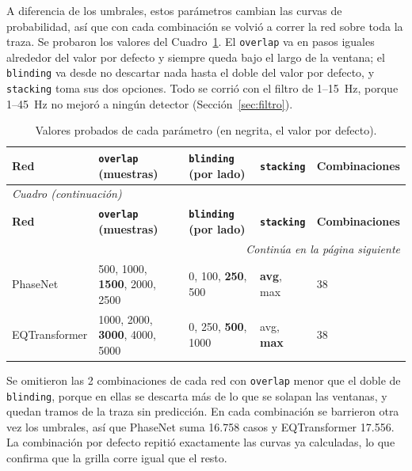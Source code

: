 \documentclass[11pt,a4paper,oneside,spanish,oldfontcommands]{memoir}
\newcommand{\cabecera}[2]{%
  \toprule #1 \\ \midrule \endfirsthead
  \multicolumn{#2}{l}{\itshape Cuadro \thetable{} (continuación)}\\
  \toprule #1 \\ \midrule \endhead
  \midrule \multicolumn{#2}{r}{\itshape Continúa en la página siguiente}\\ \endfoot
  \bottomrule \endlastfoot}
\begin{document}
A diferencia de los umbrales, estos parámetros cambian las curvas de
probabilidad, así que con cada combinación se volvió a correr la red sobre toda
la traza. Se probaron los valores del Cuadro~\ref{tab:grilla-valores}. El
\texttt{overlap} va en pasos iguales alrededor del valor por defecto y siempre
queda bajo el largo de la ventana; el \texttt{blinding} va desde no descartar
nada hasta el doble del valor por defecto, y \texttt{stacking} toma sus dos
opciones. Todo se corrió con el filtro de 1--15~Hz, porque 1--45~Hz no mejoró a
ningún detector (Sección~\ref{sec:filtro}).

{\small
\setlength{\tabcolsep}{5pt}
\begin{longtable}{lllll}
\caption{Valores probados de cada parámetro (en negrita, el valor por defecto).}\label{tab:grilla-valores}\\
\cabecera{\textbf{Red} & \textbf{\texttt{overlap} (muestras)} & \textbf{\texttt{blinding} (por lado)} & \textbf{\texttt{stacking}} & \textbf{Combinaciones}}{5}
PhaseNet & 500, 1000, \textbf{1500}, 2000, 2500 & 0, 100, \textbf{250}, 500 & \textbf{avg}, max & 38 \\
EQTransformer & 1000, 2000, \textbf{3000}, 4000, 5000 & 0, 250, \textbf{500}, 1000 & avg, \textbf{max} & 38 \\
\end{longtable}
}

Se omitieron las 2 combinaciones de cada red con \texttt{overlap} menor que el
doble de \texttt{blinding}, porque en ellas se descarta más de lo que se solapan las
ventanas, y quedan tramos de la traza sin predicción. En cada combinación se
barrieron otra vez los umbrales, así que PhaseNet suma 16.758 casos y
EQTransformer 17.556. La combinación por defecto repitió exactamente las curvas
ya calculadas, lo que confirma que la grilla corre igual que el resto.
\end{document}
